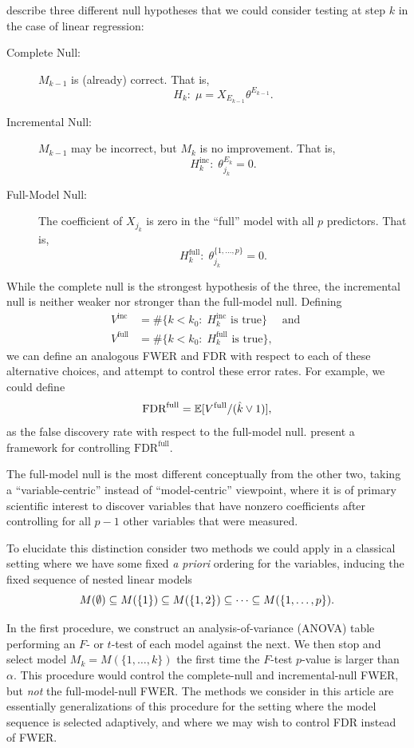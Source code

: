\documentclass{article}
\begin{document}
\citet{gsell2013sequential} describe three different null hypotheses that we could consider testing at step $k$ in the case of linear regression:
\begin{description}
\item[Complete Null:] $M_{k-1}$ is (already) correct. That is, 
\[
H_k:\;\mu = X_{E_{k-1}} \theta^{E_{k-1}}.
\]
\item[Incremental Null:] $M_{k-1}$ may be incorrect, but $M_k$ is no improvement. That is, 
\[
H_k^{\text{inc}}:\; \theta_{j_k}^{E_k} = 0.
\]
\item[Full-Model Null:] The coefficient of $X_{j_k}$ is zero in the ``full'' model with all $p$ predictors. That is,
\[
H_k^{\text{full}}:\; \theta_{j_k}^{\{1,\ldots,p\}} = 0.
\]
\end{description}

While the complete null is the strongest hypothesis of the three, the incremental null is neither weaker nor stronger than the full-model null. Defining 
\begin{align}
V^{\text{inc}} &= \#\{k < k_0:\; H_k^{\text{inc}} \text{ is true}\} \quad \text{ and } \\
V^{\text{full}} &= \#\{k < k_0:\; H_k^{\text{full}} \text{ is true}\},
\end{align}
we can define an analogous FWER and FDR with respect to each of these alternative choices, and attempt to control these error rates. For example, we could define
\[
\text{FDR}^{\text{full}} = \mathbb{E}[V^{\text{full}} / (\hat{k} \vee 1)],
\]
as the false discovery rate with respect to the full-model null. \citet{barber2014controlling} present a framework for controlling $\text{FDR}^{\text{full}}$. 

The full-model null is the most different conceptually from the other two, taking a ``variable-centric'' instead of ``model-centric'' viewpoint, where it is of primary scientific interest to discover variables that have nonzero coefficients after controlling for all $p-1$ other variables that were measured.

To elucidate this distinction consider two methods we could apply in a classical setting where we have some fixed {\em a priori} ordering for the variables, inducing the fixed sequence of nested linear models
\[
M(\emptyset) \subseteq M(\{1\}) \subseteq M(\{1,2\}) \subseteq \cdots \subseteq M(\{1,\ldots, p\}).
\]

In the first procedure, we construct an analysis-of-variance (ANOVA) table performing an $F$- or $t$-test of each model against the next. We then stop and select model $M_k=M(\{1,\ldots,k\})$ the first time the $F$-test $p$-value is larger than $\alpha$. This procedure would control the complete-null and incremental-null FWER, but {\em not} the full-model-null FWER. The methods we consider in this article are essentially generalizations of this procedure for the setting where the model sequence is selected adaptively, and where we may wish to control FDR instead of FWER.
\end{document}
